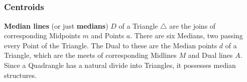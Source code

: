 \documentclass{unswthesis}
\begin{document}
\subsection{\protect\bigskip}

\subsubsection{Centroids}

\textbf{Median lines} (or just \textbf{medians}) $D$ of a Triangle $%
\triangle $ are the joins of corresponding Midpoints $m$ and Points $a$.
There are six Medians, two passing every Point of the Triangle. The Dual to
these are the Median points $d$ of a Triangle, which are the meets of
corresponding Midlines $M$ and Dual lines $A$. Since a Quadrangle has a
natural divide into Triangles, it possesses median structures.
\end{document}
